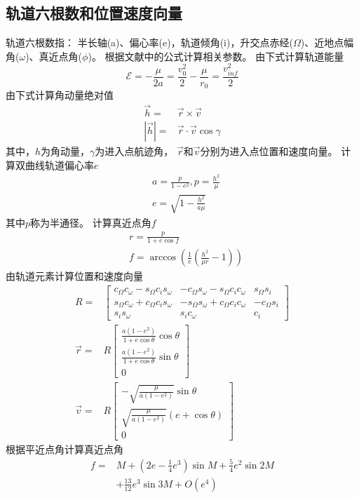 \subsection{轨道六根数和位置速度向量} \label{secFormElement}
轨道六根数指：
半长轴(a)、偏心率(e)，轨道倾角(i)，升交点赤经($\Omega$)、近地点幅角($\omega$)、真近点角($\phi$)。
根据文献\cite{mruiter2012}中的公式计算相关参数。
由下式计算轨道能量
\begin{equation*}
    \mathcal{E}=-\frac{\mu}{2a}=\frac{v_0^2}{2}-\frac{\mu}{r_0} = \frac{v_{inf}^2}{2}
\end{equation*}
由下式计算角动量绝对值
\begin{align*}
    \vec{h} =& \vec{r}\times\vec{v} \\
    |\vec{h}| =& \vec{r}\cdot\vec{v}\cos\gamma
\end{align*}
其中，$h$为角动量，$\gamma$为进入点航迹角，
$\vec{r}$和$\vec{v}$分别为进入点位置和速度向量。
计算双曲线轨道偏心率$e$
\begin{align*}
    &a=\frac{p}{1-e^2},p=\frac{h^2}{\mu} \\
    &e=\sqrt{1-\frac{h^2}{a\mu}}
\end{align*}
其中$p$称为半通径。
计算真近点角$f$
\begin{align*}
    &r=\frac{p}{1+e\cos f} \\
    &f=\arccos(\frac{1}{e}(\frac{h^2}{\mu r}-1))
\end{align*}
由轨道元素计算位置和速度向量
\begin{align*}
    R =& \left[\begin{matrix}
        c_\Omega c_\omega-s_\Omega c_i s_\omega & -c_\Omega s_\omega-s_\Omega c_i c_\omega & s_\Omega s_i \\
        s_\Omega c_\omega+c_\Omega c_i s_\omega & -s_\Omega s_\omega+c_\Omega c_i c_\omega & -c_\Omega s_i \\
        s_i s_\omega & s_i c_\omega & c_i
    \end{matrix}\right] \\
    \vec{r} =& R\left[\begin{matrix}
        \frac{a(1-e^2)}{1+e\cos\theta}\cos\theta \\ \frac{a(1-e^2)}{1+e\cos\theta}\sin\theta \\ 0
    \end{matrix}\right] \\
    \vec{v} =& R\left[\begin{matrix}
        -\sqrt{\frac{\mu}{a(1-e^2)}}\sin\theta \\ \sqrt{\frac{\mu}{a(1-e^2)}}(e+\cos\theta) \\ 0
    \end{matrix}\right]
\end{align*}
根据平近点角计算真近点角\cite{msmart1977}
\begin{align*}
    f =& M+\left(2e-{\frac {1}{4}}e^{3}\right)\sin {M}
    + {\frac {5}{4}}e^{2}\sin {2M} \\
    &+ {\frac {13}{12}}e^{3}\sin {3M}+O(e^{4})
\end{align*}

